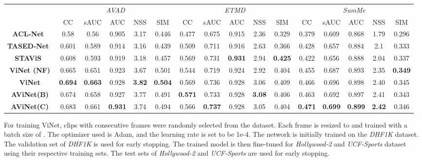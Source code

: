 \documentclass[letterpaper, 10 pt, conference]{ieeeconf}  \usepackage{times}
\begin{document}
\begin{table*}[t]
\begin{center}
\begin{tabular}{|c|ccccc|ccccc|ccccc|}
\hline
 & \multicolumn{5}{c|}{\emph{AVAD}} & \multicolumn{5}{c|}{\emph{ETMD}} & \multicolumn{5}{c|}{\emph{SumMe}} \\
 & CC & sAUC & AUC & NSS & SIM & CC & sAUC & AUC & NSS & SIM & CC & sAUC & AUC & NSS & SIM \\ 
 \hline\hline
\textbf{ACL-Net}~\cite{wang2019revisiting} & 0.58 & 0.56 & 0.905 & 3.17 & 0.446 & 0.477 & 0.675 & 0.915 & 2.36 & 0.329 & 0.379 & 0.609 & 0.868 & 1.79 & 0.296 \\
\textbf{TASED-Net}~\cite{min2019tased} & 0.601 & 0.589 & 0.914 & 3.16 & 0.439 & 0.509 & 0.711 & 0.916 & 2.63 & 0.366 & 0.428 & 0.657 & 0.884 & 2.1 & 0.333 \\
\textbf{STAViS}~\cite{tsiami2020stavis} & 0.608 & 0.593 & 0.919 & 3.18 & 0.457 & 0.569 & 0.731 & \textbf{0.931} & 2.94 & \textbf{0.425} & 0.422 & 0.656 & 0.888 & 2.04 & 0.337 \\ \hline
\textbf{ViNet (NF)} & 0.665 & 0.651 & 0.923 & 3.67 & 0.501 & 0.544 & 0.719 & 0.924 & 2.92 & 0.404 & 0.455 & 0.687 & 0.893 & 2.35 & \textbf{0.349} \\
\textbf{ViNet} & \textbf{0.694} & \textbf{0.663} & 0.928 & \textbf{3.82} & \textbf{0.504} & 0.569 & 0.736 & 0.928 & 3.06 & 0.409 & 0.466 & 0.696 & 0.898 & 2.40 & 0.345 \\
\textbf{AViNet(B)} & 0.674 & 0.658 & 0.927 & 3.77 & 0.491 &\textbf{0.571} & 0.733 & 0.928 & \textbf{3.08} & 0.406 & 0.463 & 0.692 & 0.897 & 2.41 & 0.343 \\
\textbf{AViNet(C)} & 0.683 & 0.661 & \textbf{0.931} & 3.74 & 0.494 & 0.566 & \textbf{0.737} & 0.928 & 3.05 & 0.404 & \textbf{0.471} & \textbf{0.699} & \textbf{0.899} & \textbf{2.42} & 0.346 \\ \hline
\end{tabular}



\end{center}

\label{table:audio_test_results1}
\end{table*}





For training ViNet, clips with  consecutive frames were randomly selected from the dataset. Each frame is resized to  and trained with a batch size of . The optimizer used is Adam, and the learning rate is set to be 1e-4. The network is initially trained on the \emph{DHF1K} dataset. The validation set of \emph{DHF1K} is used for early stopping. The trained model is then fine-tuned for \emph{Hollywood-2} and \emph{UCF-Sports} dataset using their respective training sets. The test sets of \emph{Hollywood-2} and \emph{UCF-Sports} are used for early stopping.
\end{document}
